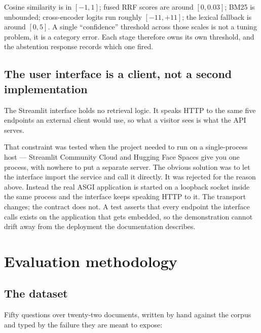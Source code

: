 \documentclass[11pt,a4paper]{article}
\begin{document}
Cosine similarity is in $[-1, 1]$; fused RRF scores are around $[0, 0.03]$; BM25
is unbounded; cross-encoder logits run roughly $[-11, +11]$; the lexical fallback
is around $[0, 5]$. A single ``confidence'' threshold across those scales is not a
tuning problem, it is a category error. Each stage therefore owns its own
threshold, and the abstention response records which one fired.

\subsection{The user interface is a client, not a second implementation}

The Streamlit interface holds no retrieval logic. It speaks HTTP to the same five
endpoints an external client would use, so what a visitor sees is what the API
serves.

That constraint was tested when the project needed to run on a single-process
host --- Streamlit Community Cloud and Hugging Face Spaces give you one process,
with nowhere to put a separate server. The obvious solution was to let the
interface import the service and call it directly. It was rejected for the reason
above. Instead the real ASGI application is started on a loopback socket inside
the same process and the interface keeps speaking HTTP to it. The transport
changes; the contract does not. A test asserts that every endpoint the interface
calls exists on the application that gets embedded, so the demonstration cannot
drift away from the deployment the documentation describes.

\section{Evaluation methodology}

\subsection{The dataset}

Fifty questions over twenty-two documents, written by hand against the corpus and
typed by the failure they are meant to expose:
\end{document}
